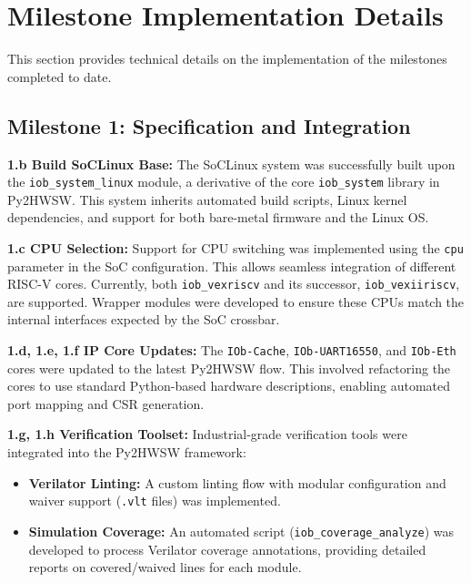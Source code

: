 %

\section{Milestone Implementation Details}
\label{sec:milestone_details}

This section provides technical details on the implementation of the milestones completed to date.

\subsection{Milestone 1: Specification and Integration}

\textbf{1.b Build SoCLinux Base:}
The SoCLinux system was successfully built upon the \texttt{iob\_system\_linux} module, a derivative of the core \texttt{iob\_system} library in Py2HWSW. This system inherits automated build scripts, Linux kernel dependencies, and support for both bare-metal firmware and the Linux OS.

\textbf{1.c CPU Selection:}
Support for CPU switching was implemented using the \texttt{cpu} parameter in the SoC configuration. This allows seamless integration of different RISC-V cores. Currently, both \texttt{iob\_vexriscv} and its successor, \texttt{iob\_vexiiriscv}, are supported. Wrapper modules were developed to ensure these CPUs match the internal interfaces expected by the SoC crossbar.

\textbf{1.d, 1.e, 1.f IP Core Updates:}
The \texttt{IOb-Cache}, \texttt{IOb-UART16550}, and \texttt{IOb-Eth} cores were updated to the latest Py2HWSW flow. This involved refactoring the cores to use standard Python-based hardware descriptions, enabling automated port mapping and CSR generation.

\textbf{1.g, 1.h Verification Toolset:}
Industrial-grade verification tools were integrated into the Py2HWSW framework:
\begin{itemize}
    \item \textbf{Verilator Linting:} A custom linting flow with modular configuration and waiver support (\texttt{.vlt} files) was implemented.
    \item \textbf{Simulation Coverage:} An automated script (\texttt{iob\_coverage\_analyze}) was developed to process Verilator coverage annotations, providing detailed reports on covered/waived lines for each module.
\end{itemize}

